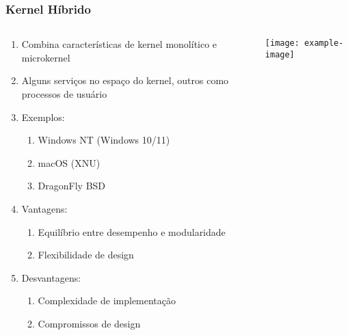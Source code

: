 \documentclass{beamer}
\begin{document}
\begin{frame}[fragile]
\frametitle{Kernel Híbrido}

\begin{columns}
    \begin{column}{0.5\textwidth}
        \begin{enumerate}
            \item Combina características de kernel monolítico e microkernel
            \item Alguns serviços no espaço do kernel, outros como processos de usuário
            \item Exemplos:
            \begin{enumerate}
                \item Windows NT (Windows 10/11)
                \item macOS (XNU)
                \item DragonFly BSD
            \end{enumerate}
            \item Vantagens:
            \begin{enumerate}
                \item Equilíbrio entre desempenho e modularidade
                \item Flexibilidade de design
            \end{enumerate}
            \item Desvantagens:
            \begin{enumerate}
                \item Complexidade de implementação
                \item Compromissos de design
            \end{enumerate}
        \end{enumerate}
    \end{column}
    
    \begin{column}{0.5\textwidth}
        \begin{center}
            \texttt{[image: example-image]}
        \end{center}
    \end{column}
\end{columns}
\end{frame}
\end{document}
